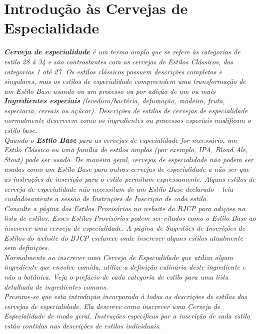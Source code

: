 \clearpage
{}
\divisorLine
\section*{Introdução às Cervejas de Especialidade}
\textit{\textbf{Cerveja de especialidade} é um termo amplo que se refere às categorias de estilo 28 à 34 e são contrastantes com as cervejas de Estilos Clássicos, das categorias 1 até 27. Os estilos clássicos possuem descrições completas e singulares, mas os estilos de especialidade compreendem uma transformação de um Estilo Base usando ou um processo ou por adição de um ou mais \textbf{Ingredientes especiais} (levedura/bactéria, defumação, madeira, fruta, especiaria, cereais ou açúcar). Descrições de estilos de cervejas de especialidade normalmente descrevem como os ingredientes ou processos especiais modificam o estilo base.}\\
\textit{Quando o \textbf{Estilo Base} para as cervejas de especialidade for necessário, um Estilo Clássico ou uma família de estilos amplas (por exemplo, IPA, Blond Ale, Stout) pode ser usado. De maneira geral, cervejas de especialidade não podem ser usadas como um Estilo Base para outras cervejas de especialidade a não ser que as instruções de inscrição para o estilo permitam expressamente. Alguns estilos de cerveja de especialidade não necessitam de um Estilo Base declarado – leia cuidadosamente a sessão de Instruções de Inscrição de cada estilo.}\\
\textit{Consulte a página dos Estilos Provisórios no website do BJCP para adições na lista de estilos. Esses Estilos Provisórios podem ser citados como o Estilo Base ao inscrever uma cerveja de especialidade. A página de Sugestões de Inscrições de Estilos do website do BJCP esclarece onde inscrever alguns estilos atualmente sem definições.}\\
\textit{Normalmente ao inscrever uma Cerveja de Especialidade que utiliza algum ingrediente que envolve comida, utilize a definição culinária deste ingrediente e não a botânica. Veja o prefácio de cada categoria de estilo para uma lista detalhada de ingredientes comuns. }\\
\textit{Presume-se que esta introdução incorporada à todas as descrições de estilos das cervejas de especialidade. Ela descreve como inscrever uma Cerveja de Especialidade de modo geral. Instruções específicas par a inscrição de cada estilo estão contidas nas descrições de estilos individuais.}\\
\begin{multicols*}{2}


\end{multicols*}